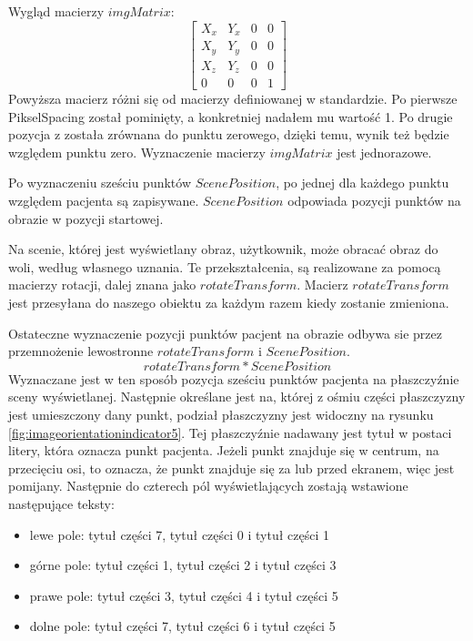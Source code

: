 \begin{itemize}
    Wygląd macierzy $imgMatrix$:
    \[
        \begin{bmatrix}
            X_x & Y_x & 0 & 0 \\
            X_y & Y_y & 0 & 0 \\
            X_z & Y_z & 0 & 0\\
            0 & 0 & 0 & 1
        \end{bmatrix}
    \]
    Powyższa macierz różni się od macierzy definiowanej w standardzie.
    Po pierwsze PikselSpacing został pominięty, a konkretniej nadałem mu wartość 1.
    Po drugie pozycja z  została zrównana do punktu zerowego, dzięki temu, wynik też będzie względem punktu zero.
    Wyznaczenie macierzy $imgMatrix$ jest jednorazowe.

    Po wyznaczeniu sześciu punktów $ScenePosition$, po jednej dla każdego punktu względem pacjenta są zapisywane. $ScenePosition$ odpowiada pozycji punktów na obrazie w pozycji startowej.

    Na scenie, której jest wyświetlany obraz, użytkownik, może obracać obraz do woli, według własnego uznania.
    Te przekształcenia, są realizowane za pomocą macierzy rotacji, dalej znana jako $rotateTransform$.
    Macierz $rotateTransform$ jest przesyłana do naszego obiektu  za każdym razem kiedy zostanie zmieniona.

    Ostateczne wyznaczenie pozycji punktów pacjent na obrazie odbywa sie przez przemnożenie lewostronne $rotateTransform$ i $ScenePosition$.
    \[rotateTransform * ScenePosition\]
    Wyznaczane jest w ten sposób pozycja sześciu punktów pacjenta na płaszczyźnie sceny wyświetlanej.
    Następnie określane jest na, której z ośmiu części płaszczyzny jest umieszczony dany punkt, podział płaszczyzny jest widoczny na rysunku \ref{fig:imageorientationindicator5}.
    Tej płaszczyźnie nadawany jest tytuł w postaci litery, która oznacza punkt pacjenta.
    Jeżeli punkt znajduje się w centrum, na przecięciu osi, to oznacza, że punkt znajduje się za lub przed ekranem, więc jest pomijany.
    Następnie do czterech pól wyświetlających zostają wstawione następujące teksty:
    \begin{itemize}
        \item lewe pole: tytuł części 7, tytuł części 0 i tytuł części 1
        \item górne pole: tytuł części 1, tytuł części 2 i tytuł części 3
        \item prawe pole: tytuł części 3, tytuł części 4 i tytuł części 5
        \item dolne pole: tytuł części 7, tytuł części 6 i tytuł części 5
    \end{itemize}


\end{itemize}
